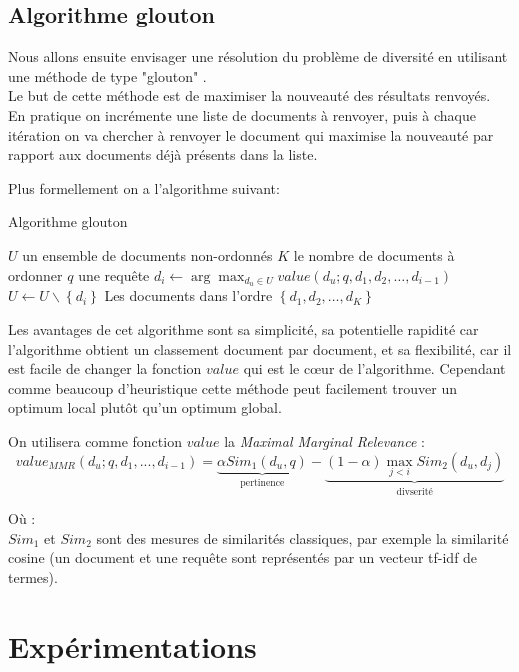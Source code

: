 \documentclass{article}
\begin{document}
\subsection{Algorithme glouton} Nous allons ensuite envisager une résolution du problème de diversité en utilisant une méthode de type "glouton" \cite{zhai03}. \\

Le but de cette méthode est de maximiser la nouveauté des résultats renvoyés. En pratique on incrémente une liste de documents à renvoyer, puis à chaque itération on va chercher à renvoyer le document qui maximise la nouveauté par rapport aux documents déjà présents dans la liste.

Plus formellement on a l'algorithme suivant:

\begin{algorithm}
\caption{Algorithme glouton}
\begin{algorithmic}
\REQUIRE $U$ un ensemble de documents non-ordonnés
\REQUIRE $K$ le nombre de documents à ordonner
\REQUIRE $q$ une requête
\STATE $d_i \leftarrow \arg\max_{d_u \in U} value(d_u;q, d_1,d_2,\dots,d_{i-1})$ 
\STATE $U \leftarrow U \backslash \left\{d_i\right\}$
\ENDFOR
\RETURN Les documents dans l'ordre $\left\{d_1, d_2,\dots, d_K\right\}$
\end{algorithmic}
\end{algorithm}

Les avantages de cet algorithme sont sa simplicité, sa potentielle rapidité car l'algorithme obtient un classement document par document, et sa flexibilité, car il est facile de changer la fonction $value$ qui est le cœur de l'algorithme. Cependant comme beaucoup d'heuristique cette méthode peut facilement trouver un optimum local plutôt qu'un optimum global.


On utilisera comme fonction $value$ la \textit{Maximal Marginal Relevance} : 
$$value_{MMR}(d_u;q,d_1,...,d_{i-1}) = \underbrace{\alpha Sim_{1}(d_u,q)}_{\text{pertinence}} - \underbrace{(1-\alpha)\max\limits_{j < i} Sim_{2}(d_u, d_j)}_{\text{divserité}}$$

Où :\\
$Sim_{1}$ et $Sim_{2}$ sont des mesures de similarités classiques, par exemple la similarité cosine (un document et une requête sont représentés par un vecteur tf-idf de termes).

\newpage
\section{Expérimentations}
\end{document}
